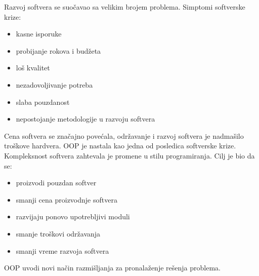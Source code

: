 \documentclass[../main.tex]{subfiles}
\begin{document}
Razvoj softvera se suočavao sa velikim brojem problema. Simptomi softverske krize:
\begin{itemize}[]
\item kasne isporuke
\item probijanje rokova i budžeta
\item loš kvalitet
\item nezadovoljivanje potreba
\item slaba pouzdanost
\item nepostojanje metodologije u razvoju softvera
\end{itemize}
Cena softvera se značajno povećala, održavanje i razvoj softvera je nadmašilo troškove hardvera. OOP je nastala kao jedna od posledica softverske krize. Kompleksnost softvera zahtevala je promene u stilu programiranja. Cilj je bio da se:
\begin{itemize}
\item proizvodi pouzdan softver
\item smanji cena proizvodnje softvera
\item razvijaju ponovo upotrebljivi moduli
\item smanje troškovi održavanja
\item smanji vreme razvoja softvera
\end{itemize}
OOP uvodi novi način razmišljanja za pronalaženje rešenja problema.
\end{document}
